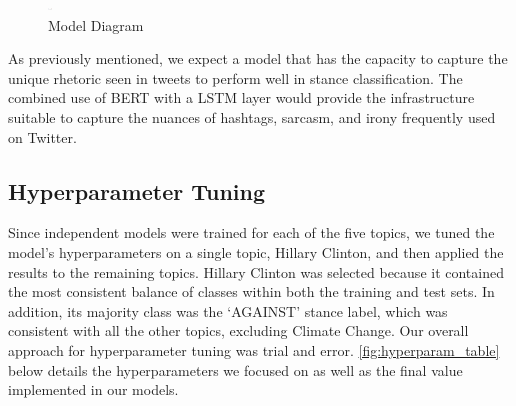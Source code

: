 \documentclass[]{article}
\begin{document}
\begin{figure}

{\centering \includegraphics[width=4,height=4]{images/Dessouky_Spittle_Model_Diagram} 

}

\caption{\label{fig:model_diagram}Model Diagram}\label{fig:model_diagram_chunk}
\end{figure}

As previously mentioned, we expect a model that has the capacity to
capture the unique rhetoric seen in tweets to perform well in stance
classification. The combined use of BERT with a LSTM layer would provide
the infrastructure suitable to capture the nuances of hashtags, sarcasm,
and irony frequently used on Twitter.

\hypertarget{hyperparameter-tuning}{%
\subsection{Hyperparameter Tuning}\label{hyperparameter-tuning}}

Since independent models were trained for each of the five topics, we
tuned the model's hyperparameters on a single topic, Hillary Clinton,
and then applied the results to the remaining topics. Hillary Clinton
was selected because it contained the most consistent balance of classes
within both the training and test sets. In addition, its majority class
was the `AGAINST' stance label, which was consistent with all the other
topics, excluding Climate Change. Our overall approach for
hyperparameter tuning was trial and error.
\autoref{fig:hyperparam_table} below details the hyperparameters we
focused on as well as the final value implemented in our models.
\end{document}
